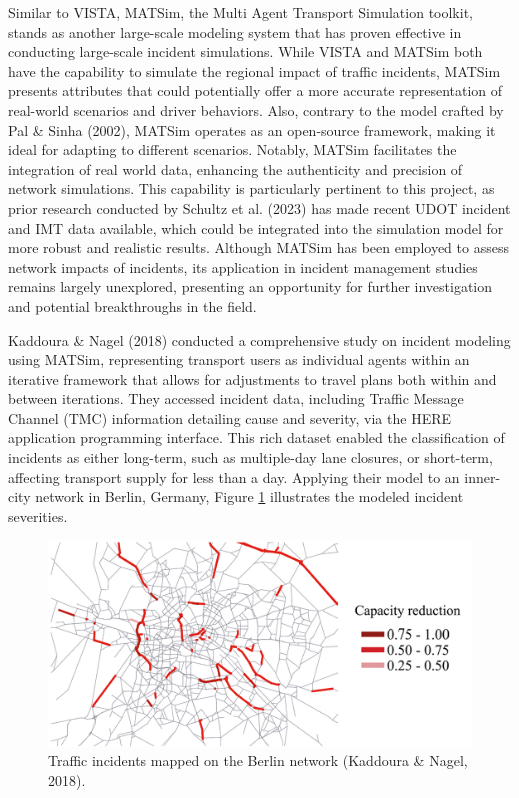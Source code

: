\documentclass[fancy, oneside, mastersfancy, ms]{byuthesis}
\begin{document}
Similar to VISTA, MATSim, the Multi Agent Transport Simulation toolkit,
stands as another large-scale modeling system that has proven effective
in conducting large-scale incident simulations. While VISTA and MATSim
both have the capability to simulate the regional impact of traffic
incidents, MATSim presents attributes that could potentially offer a
more accurate representation of real-world scenarios and driver
behaviors. Also, contrary to the model crafted by Pal \& Sinha (2002),
MATSim operates as an open-source framework, making it ideal for
adapting to different scenarios. Notably, MATSim facilitates the
integration of real world data, enhancing the authenticity and precision
of network simulations. This capability is particularly pertinent to
this project, as prior research conducted by Schultz et al. (2023) has
made recent UDOT incident and IMT data available, which could be
integrated into the simulation model for more robust and realistic
results. Although MATSim has been employed to assess network impacts of
incidents, its application in incident management studies remains
largely unexplored, presenting an opportunity for further investigation
and potential breakthroughs in the field.

Kaddoura \& Nagel (2018) conducted a comprehensive study on incident
modeling using MATSim, representing transport users as individual agents
within an iterative framework that allows for adjustments to travel
plans both within and between iterations. They accessed incident data,
including Traffic Message Channel (TMC) information detailing cause and
severity, via the HERE application programming interface. This rich
dataset enabled the classification of incidents as either long-term,
such as multiple-day lane closures, or short-term, affecting transport
supply for less than a day. Applying their model to an inner-city
network in Berlin, Germany, Figure \ref{fig-berlin-cap} illustrates the
modeled incident severities.

\begin{figure}
\centering
\includegraphics{figures/berlin_capacity.png}
\caption[Traffic incidents mapped on the Berlin network.]{Traffic incidents mapped on the Berlin network (Kaddoura \& Nagel, 2018).}
\label{fig-berlin-cap}
\end{figure}
\end{document}
